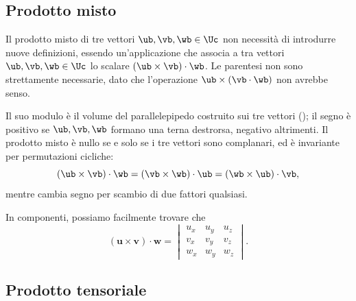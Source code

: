 



\subsection{Prodotto misto}

Il prodotto misto di tre vettori $\ub, \vb, \wb \in \Uc$ non necessità di introdurre nuove definizioni, essendo un'applicazione che associa a tra vettori $\ub, \vb, \wb\in \Uc$ lo scalare $	(\ub \times \vb) \cdot \wb$. Le parentesi non sono strettamente necessarie, dato che l'operazione $\ub \times (\vb\cdot \wb)$ non avrebbe senso.

Il suo modulo è il volume del parallelepipedo costruito sui tre
vettori (); il segno è positivo se $\ub, \vb,
\wb$ formano una terna destrorsa, negativo altrimenti. Il prodotto misto
è nullo se e solo se i tre vettori sono complanari, ed è invariante per
permutazioni cicliche:
\begin{equation}
	(\ub \times \vb) \cdot \wb
	= (\vb \times \wb) \cdot \ub
	= (\wb \times \ub) \cdot \vb,
\end{equation}
mentre cambia segno per scambio di due fattori qualsiasi.


In componenti, possiamo facilmente trovare che 
\begin{equation}\label{eq:prod_misto}
	(\bm{u} \times \bm{v}) \cdot \bm{w}
	= \begin{vmatrix}
		u_x & u_y & u_z \\
		v_x & v_y & v_z \\
		w_x & w_y & w_z
	\end{vmatrix}.
\end{equation}







\subsection{Prodotto tensoriale}

